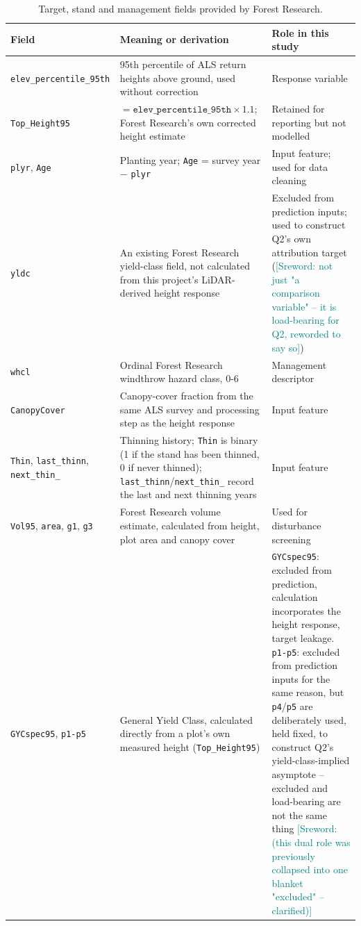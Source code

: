 \documentclass[logo,msc,ai]{infthesis}           %
\newcommand{\sr}[1]{\textcolor{teal}{[Sreword: #1]}}
\begin{document}
\begin{table}[!htbp]
\scriptsize

\setlength{\tabcolsep}{3pt}
\renewcommand{\arraystretch}{0.95}
\begin{tabular}{
    >{\raggedright\arraybackslash}p{2.6cm}
    >{\raggedright\arraybackslash}p{7.0cm}
    >{\raggedright\arraybackslash}p{3.2cm}
}
\hline
Field & Meaning or derivation & Role in this study \\
\hline
\texttt{elev\_\allowbreak percentile\_\allowbreak 95th} & 95th percentile of ALS return heights above ground, used without correction & Response variable \\
\texttt{Top\_Height95} & $=\texttt{elev\_percentile\_95th}\times1.1$; Forest Research's own corrected height estimate & Retained for reporting but not modelled \\
\texttt{plyr}, \texttt{Age} & Planting year; \texttt{Age} = survey year $-$ \texttt{plyr} & Input feature; used for data cleaning \\
\texttt{yldc} & An existing Forest Research yield-class field, not calculated from this project's LiDAR-derived height response & Excluded from prediction inputs; used to construct Q2's own attribution target (\sr{not just "a comparison variable" -- it is load-bearing for Q2, reworded to say so}) \\
\texttt{whcl} & Ordinal Forest Research windthrow hazard class, 0-6 & Management descriptor \\
\texttt{CanopyCover} & Canopy-cover fraction from the same ALS survey and processing step as the height response & Input feature \\
\texttt{Thin}, \texttt{last\_thinn}, \texttt{next\_thin\_} & Thinning history; \texttt{Thin} is binary (1 if the stand has been thinned, 0 if never thinned); \texttt{last\_thinn}/\texttt{next\_thin\_} record the last and next thinning years & Input feature \\
\texttt{Vol95}, \texttt{area}, \texttt{g1}, \texttt{g3} & Forest Research volume estimate, calculated from height, plot area and canopy cover & Used for disturbance screening \\
\texttt{GYCspec95}, \texttt{p1-p5} & General Yield Class, calculated directly from a plot's own measured height (\texttt{Top\_Height95}) & \texttt{GYCspec95}: excluded from prediction, calculation incorporates the height response, target leakage. \texttt{p1-p5}: excluded from prediction inputs for the same reason, but \texttt{p4}/\texttt{p5} are deliberately used, held fixed, to construct Q2's yield-class-implied asymptote -- excluded and load-bearing are not the same thing \sr{(this dual role was previously collapsed into one blanket "excluded" -- clarified)} \\
\hline
\end{tabular}
\caption{\small{Target, stand and management fields provided by Forest Research.}}
\label{tab:data-fields}
\end{table}
\end{document}

